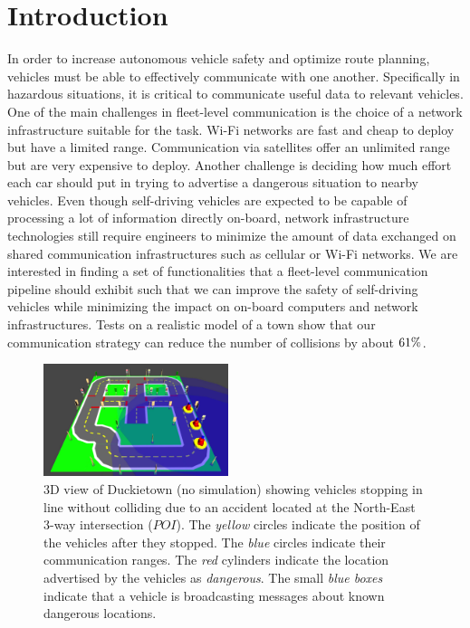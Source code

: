 \section{Introduction}
In order to increase autonomous vehicle safety and optimize route planning, vehicles must be able to effectively
communicate with one another. Specifically in hazardous situations, it is critical to communicate useful data to
relevant vehicles.
One of the main challenges in fleet-level communication is the choice of a network infrastructure suitable
for the task. Wi-Fi networks are fast and cheap to deploy but have a limited range. Communication via satellites
offer an unlimited range but are very expensive to deploy. Another challenge is deciding how much effort
each car should put in trying to advertise a dangerous situation to nearby vehicles.
Even though self-driving vehicles are expected to be capable of processing a lot of information directly on-board,
network infrastructure technologies still require engineers to minimize the amount of data exchanged on shared
communication infrastructures such as cellular or Wi-Fi networks.
We are interested in finding a set of functionalities that a fleet-level communication pipeline should exhibit
such that we can improve the safety of self-driving vehicles while minimizing the impact on on-board computers
and network infrastructures.
Tests on a realistic model of a town show that our communication strategy can reduce the number of
collisions by about $\collision_ratio_reduction_perc\%$.

\begin{figure}[t]
	\vspace{0.2cm}
    \centering
    \includegraphics[width=0.48\textwidth]{figures/full-model_viewer.jpg}
    \caption{3D view of Duckietown (no simulation) showing vehicles stopping in line without colliding
    due to an accident located at the North-East 3-way intersection ($POI$).
    The \textit{yellow} circles indicate the position of the vehicles after they stopped.
    The \textit{blue} circles indicate their communication ranges. The \textit{red} cylinders
    indicate the location advertised by the vehicles as \textit{dangerous}. The small \textit{blue boxes}
    indicate that a vehicle is broadcasting messages about known dangerous locations.  \label{fig:3d_viewer_full_model}}
\end{figure}

